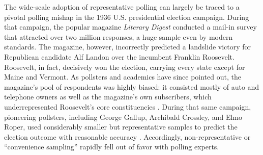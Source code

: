\documentclass[preprint,authoryear,12pt]{elsarticle}
\begin{document}
The wide-scale adoption of representative polling can largely be traced to a
pivotal polling mishap in the 1936 U.S. presidential election campaign.  During
that campaign, the popular magazine \textsl{Literary Digest} conducted a mail-in
survey that attracted over two million responses, a huge sample even by modern standards.
The magazine, however, incorrectly predicted a landslide victory for
Republican candidate Alf Landon over the incumbent Franklin Roosevelt.  Roosevelt,
in fact, decisively won the election, carrying every state except for Maine and
Vermont.  As pollsters and academics have since pointed out, the magazine's pool
of respondents was highly biased: it consisted mostly of auto and telephone
owners as well as the magazine's own subscribers, which underrepresented
Roosevelt's core constituencies \citep{squire19881936}.  During that same
campaign, pioneering pollsters, including George Gallup, Archibald Crossley, and
Elmo Roper, used considerably smaller but representative samples to predict the
election outcome with reasonable accuracy \citep{gosnell1937technical}.
Accordingly, non-representative or ``convenience sampling'' rapidly
fell out of favor with polling experts.
\end{document}
